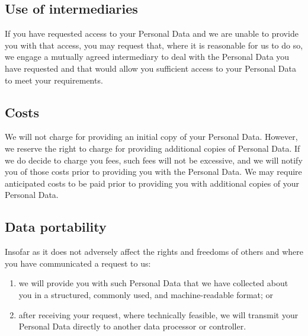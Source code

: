 \documentclass[10pt]{article}
\begin{document}
\subsection{Use of intermediaries}
If you have requested access to your Personal Data and we are unable to provide you with that access, you may request that, where it is reasonable for us to do so, we engage a mutually agreed intermediary to deal with the Personal Data you have requested and that would allow you sufficient access to your Personal Data to meet your requirements.

\subsection{Costs}
We will not charge for providing an initial copy of your Personal Data. However, we reserve the right to charge for providing additional copies of Personal Data. If we do decide to charge you fees, such fees will not be excessive, and we will notify you of those costs prior to providing you with the Personal Data. We may require anticipated costs to be paid prior to providing you with additional copies of your Personal Data.

\subsection{Data portability}
Insofar as it does not adversely affect the rights and freedoms of others and where you have communicated a request to us:
\begin{enumerate}[(1)]
	\item we will provide you with such Personal Data that we have collected about you in a structured, commonly used, and machine-readable format; or

	\item after receiving your request, where technically feasible, we will transmit your Personal Data directly to another data processor or controller.
\end{enumerate}
\end{document}
